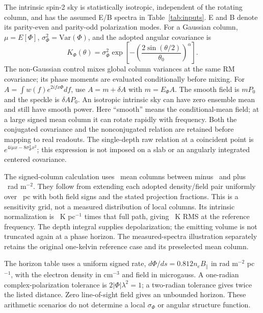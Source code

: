\documentclass[10pt,letterpaper]{article}
\begin{document}
The intrinsic spin-2 sky is statistically isotropic, independent of the
rotating column, and has the assumed E/B spectra in Table~\ref{tab:inputs}.
E and B denote its parity-even and parity-odd polarization modes.
For a Gaussian column, $\mu=E[\Phi]$, $\sigma_\Phi^2=\mathrm{Var}(\Phi)$,
and the adopted angular covariance is
\begin{equation}
 K_\Phi(\theta)=\sigma_\Phi^2
 \exp\!\left[-\left(\frac{2\sin(\theta/2)}{\theta_0}\right)^\alpha\right].
\end{equation}
The non-Gaussian control mixes global column variances at the same RM
covariance; its phase moments are evaluated conditionally before mixing.
For $A=\int w(f)e^{2ifx\Phi}df$, use $A=m+\delta A$ with
$m=E_\Phi A$. The smooth field is $mP_0$ and the speckle is
$\delta A P_0$. An isotropic intrinsic sky can have zero ensemble mean
and still have smooth power. Here ``smooth'' means the conditional-mean
field; at a large signed mean column it can rotate rapidly with frequency.
Both the conjugated covariance and the
nonconjugated relation are retained before mapping to real readouts.
The single-depth raw relation at a coincident point is
$e^{4i\mu x-8\sigma_\Phi^2x^2}$; this expression is not imposed on a slab
or an angularly integrated centered covariance.



The signed-column calculation uses \MeanCaseCount\ mean columns between
minus \MaxMeanDepth\ and plus \MaxMeanDepth\ rad m$^{-2}$. They follow from
extending each adopted density/field pair uniformly over \EmittingPathPc\ pc
with both field signs and the stated projection fractions. This is a
sensitivity grid, not a measured distribution of local columns. Its intrinsic
normalization is \UnitEmissivity\ K pc$^{-1}$ times that full path, giving
\PhysicalRms\ K RMS at the reference frequency. The depth integral supplies
depolarization; the emitting volume is not truncated again at a phase horizon.
The measured-spectra illustration separately retains the original one-kelvin
reference case and its preselected mean column.

The horizon table uses a uniform signed rate,
$d\Phi/ds=0.812 n_e B_\parallel$ in rad m$^{-2}$ pc$^{-1}$, with the
electron density in cm$^{-3}$ and field in microgauss. A one-radian
complex-polarization tolerance is $2|\Phi|\lambda^2=1$; a two-radian
tolerance gives twice the listed distance. Zero line-of-sight field gives
an unbounded horizon. These arithmetic scenarios do not determine a local
$\sigma_\Phi$ or angular structure function.
\end{document}
